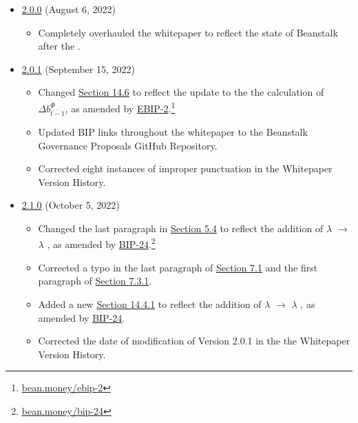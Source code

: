 \documentclass[class=article, crop=false]{standalone}
\begin{document}
\begin{itemize}[topsep=0pt, itemsep=3pt,leftmargin=16pt]
\begin{itemize}
    \end{itemize}  
        \item \href{https://github.com/BeanstalkFarms/Beanstalk-Whitepaper/blob/master/version-history/beanstalk2_0_0.pdf}{2.0.0} (August 6, 2022)
    \begin{itemize}
        \item Completely overhauled the whitepaper to reflect the state of Beanstalk after the .
    \end{itemize}  
        \item \href{https://github.com/BeanstalkFarms/Beanstalk-Whitepaper/blob/master/version-history/beanstalk2_0_1.pdf}{2.0.1} (September 15, 2022)
    \begin{itemize}
        \item Changed \hyperlink{subsection.14.6}{Section 14.6} to reflect the update to the the calculation of $\Delta b_{\overline{t-1}}^{\Phi}$, as amended by \href{https://bean.money/ebip-2}{EBIP-2}.\footnote{\href{https://bean.money/ebip-2}{bean.money/ebip-2}}
        \item Updated BIP links throughout the whitepaper to the Beanstalk Governance Proposals GitHub Repository.
        \item Corrected eight instances of improper punctuation in the Whitepaper Version History.
    \end{itemize}  
        \item \href{https://github.com/BeanstalkFarms/Beanstalk-Whitepaper/blob/master/version-history/beanstalk2_1_0.pdf}{2.1.0} (October 5, 2022)
    \begin{itemize}
        \item Changed the last paragraph in \hyperlink{subsection.5.4}{Section 5.4} to reflect the addition of $\lambda$ $\rightarrow$ $\lambda$ , as amended by \href{https://bean.money/bip-24}{BIP-24}.\footnote{\href{https://bean.money/bip-24}{bean.money/bip-24}}
        \item Corrected a typo in the last paragraph of \hyperlink{subsection.7.1}{Section 7.1} and the first paragraph of \hyperlink{subsubsection.7.3.1}{Section 7.3.1}.
        \item Added a new \hyperlink{subsubsection.14.4.1}{Section 14.4.1} to reflect the addition of $\lambda$ $\rightarrow$ $\lambda$ , as amended by \href{https://bean.money/bip-24}{BIP-24}.
        \item Corrected the date of modification of Version 2.0.1 in the the Whitepaper Version History.

\end{itemize}
\end{itemize}
\end{document}
